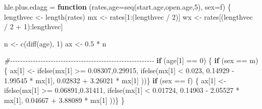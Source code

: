\documentclass[
]{article}
\newenvironment{Shaded}{\begin{snugshade}}{\end{snugshade}}
\newcommand{\AttributeTok}[1]{\textcolor[rgb]{0.77,0.63,0.00}{#1}}
\newcommand{\CommentTok}[1]{\textcolor[rgb]{0.56,0.35,0.01}{\textit{#1}}}
\newcommand{\ControlFlowTok}[1]{\textcolor[rgb]{0.13,0.29,0.53}{\textbf{#1}}}
\newcommand{\DecValTok}[1]{\textcolor[rgb]{0.00,0.00,0.81}{#1}}
\newcommand{\FloatTok}[1]{\textcolor[rgb]{0.00,0.00,0.81}{#1}}
\newcommand{\FunctionTok}[1]{\textcolor[rgb]{0.00,0.00,0.00}{#1}}
\newcommand{\NormalTok}[1]{#1}
\newcommand{\OtherTok}[1]{\textcolor[rgb]{0.56,0.35,0.01}{#1}}
\newcommand{\SpecialCharTok}[1]{\textcolor[rgb]{0.00,0.00,0.00}{#1}}
\newcommand{\StringTok}[1]{\textcolor[rgb]{0.31,0.60,0.02}{#1}}
\begin{document}
\begin{Shaded}
\begin{Highlighting}[]
\NormalTok{hle.plus.edagg }\OtherTok{=} \ControlFlowTok{function}\NormalTok{ (rates,}\AttributeTok{age=}\FunctionTok{seq}\NormalTok{(start.age,open.age,}\DecValTok{5}\NormalTok{), }\AttributeTok{sex=}\StringTok{\textquotesingle{}f\textquotesingle{}}\NormalTok{) \{}
\NormalTok{  lengthvec }\OtherTok{\textless{}{-}} \FunctionTok{length}\NormalTok{(rates)}
\NormalTok{  mx }\OtherTok{\textless{}{-}}\NormalTok{ rates[}\DecValTok{1}\SpecialCharTok{:}\NormalTok{(lengthvec }\SpecialCharTok{/} \DecValTok{2}\NormalTok{)]}
\NormalTok{  wx }\OtherTok{\textless{}{-}}\NormalTok{ rates[(lengthvec }\SpecialCharTok{/} \DecValTok{2} \SpecialCharTok{+} \DecValTok{1}\NormalTok{)}\SpecialCharTok{:}\NormalTok{lengthvec]}
  
\NormalTok{  n }\OtherTok{\textless{}{-}} \FunctionTok{c}\NormalTok{(}\FunctionTok{diff}\NormalTok{(age), }\DecValTok{1}\NormalTok{)}
\NormalTok{  ax }\OtherTok{\textless{}{-}} \FloatTok{0.5} \SpecialCharTok{*}\NormalTok{ n}
  
  \CommentTok{\#{-}{-}{-}{-}{-}{-}{-}{-}{-}{-}{-}{-}{-}{-}{-}{-}{-}{-}{-}{-}{-}{-}{-}{-}{-}{-}{-}{-}{-}{-}{-}{-}{-}{-}{-}{-}{-}{-}{-}{-}{-}{-}{-}{-}{-}{-}{-}{-}{-}{-}{-}{-}{-}{-}{-}{-}{-}}
  \ControlFlowTok{if}\NormalTok{ (age[}\DecValTok{1}\NormalTok{] }\SpecialCharTok{==} \DecValTok{0}\NormalTok{) \{}
    \ControlFlowTok{if}\NormalTok{ (sex }\SpecialCharTok{==} \StringTok{\textquotesingle{}m\textquotesingle{}}\NormalTok{) \{}
\NormalTok{      ax[}\DecValTok{1}\NormalTok{] }\OtherTok{\textless{}{-}} \FunctionTok{ifelse}\NormalTok{(mx[}\DecValTok{1}\NormalTok{] }\SpecialCharTok{\textgreater{}=} \FloatTok{0.08307}\NormalTok{,}\FloatTok{0.29915}\NormalTok{,}
                      \FunctionTok{ifelse}\NormalTok{(mx[}\DecValTok{1}\NormalTok{] }\SpecialCharTok{\textless{}} \FloatTok{0.023}\NormalTok{,}
                             \FloatTok{0.14929} \SpecialCharTok{{-}} \FloatTok{1.99545} \SpecialCharTok{*}\NormalTok{ mx[}\DecValTok{1}\NormalTok{],}
                             \FloatTok{0.02832} \SpecialCharTok{+} \FloatTok{3.26021} \SpecialCharTok{*}\NormalTok{ mx[}\DecValTok{1}\NormalTok{] ))\}}
    \ControlFlowTok{if}\NormalTok{ (sex }\SpecialCharTok{==} \StringTok{\textquotesingle{}f\textquotesingle{}}\NormalTok{) \{}
\NormalTok{      ax[}\DecValTok{1}\NormalTok{] }\OtherTok{\textless{}{-}} \FunctionTok{ifelse}\NormalTok{(mx[}\DecValTok{1}\NormalTok{] }\SpecialCharTok{\textgreater{}=} \FloatTok{0.06891}\NormalTok{,}\FloatTok{0.31411}\NormalTok{,}
                      \FunctionTok{ifelse}\NormalTok{(mx[}\DecValTok{1}\NormalTok{] }\SpecialCharTok{\textless{}} \FloatTok{0.01724}\NormalTok{,}
                             \FloatTok{0.14903} \SpecialCharTok{{-}} \FloatTok{2.05527} \SpecialCharTok{*}\NormalTok{ mx[}\DecValTok{1}\NormalTok{],}
                             \FloatTok{0.04667} \SpecialCharTok{+} \FloatTok{3.88089} \SpecialCharTok{*}\NormalTok{ mx[}\DecValTok{1}\NormalTok{] ))\} \}}
  

\end{Highlighting}
\end{Shaded}
\end{document}
